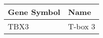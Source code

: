 \begin{tabular}{ll}
\toprule
Gene Symbol &    Name \\
\midrule
       TBX3 & T-box 3 \\
\bottomrule
\end{tabular}

